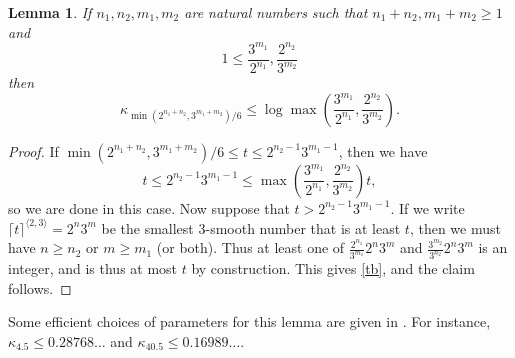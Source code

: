 \documentclass[12pt,a4paper,reqno]{amsart}
\numberwithin{equation}{section}
\theoremstyle{plain}
\newtheorem{lemma}[theorem]{Lemma}
\theoremstyle{definition}
\begin{document}
\begin{lemma}\label{lemcount-0}  If $n_1,n_2,m_1,m_2$ are natural numbers such that $n_1+n_2, m_1+m_2 \geq 1$ and
$$ 1 \leq \frac{3^{m_1}}{2^{n_1}}, \frac{2^{n_2}}{3^{m_2}}$$
then
$$ \kappa_{\min( 2^{n_1+n_2},3^{m_1+m_2})/6} \leq \log \max\left(\frac{3^{m_1}}{2^{n_1}}, \frac{2^{n_2}}{3^{m_2}}\right).$$
\end{lemma}

\begin{proof}  If $\min( 2^{n_1+n_2},3^{m_1+m_2})/6 \leq t \leq 2^{n_2-1} 3^{m_1-1}$, then we have
\begin{equation}\label{tb} 
  t \leq 2^{n_2-1} 3^{m_1-1} \leq \max\left(\frac{3^{m_1}}{2^{n_1}}, \frac{2^{n_2}}{3^{m_2}}\right) t,
\end{equation}
so we are done in this case.  Now suppose that $t > 2^{n_2-1} 3^{m_1-1}$.
If we write $\lceil t \rceil^{\langle 2,3 \rangle} =2^n 3^m$ be the smallest $3$-smooth number that is at least $t$, then we must have $n \geq n_2$ or $m \geq m_1$ (or both).  Thus at least one of $\frac{2^{n_1}}{3^{m_1}} 2^n 3^m$ and $\frac{3^{m_2}}{3^{n_2}} 2^n 3^m$ is an integer, and is thus at most $t$ by construction.  This gives \eqref{tb}, and the claim follows.
\end{proof}

Some efficient choices of parameters for this lemma are given in .  For instance, $\kappa_{4.5} \leq 0.28768\dots$ and $\kappa_{40.5} \leq 0.16989\dots$.
\end{document}

